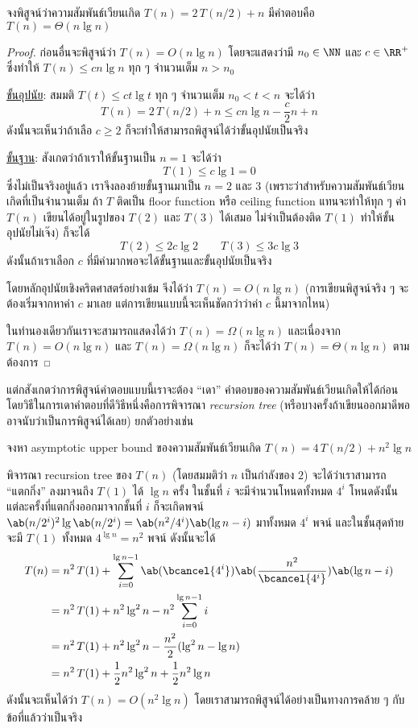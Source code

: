 \begin{exbox}
	จงพิสูจน์ว่าความสัมพันธ์เวียนเกิด $T(n) = 2\, T(n/2) + n$ มีคำตอบคือ $T(n) = \Theta(n\lg n)$
\end{exbox}
\begin{proof}
	ก่อนอื่นจะพิสูจน์ว่า $T(n) = O(n\lg n)$ โดยจะแสดงว่ามี $n_0 \in \NN$ และ $c \in \RR^+$ ซึ่งทำให้ $T(n) \leq cn\lg n$ ทุก ๆ จำนวนเต็ม $n > n_0$
	
	\underline{ขั้นอุปนัย}: สมมติ $T(t) \leq ct\lg t$ ทุก ๆ จำนวนเต็ม $n_0 < t < n$ จะได้ว่า
	\[
		T(n) = 2\,T(n/2) + n \leq cn\lg n - \frac{c}{2}n + n
	\]
	ดังนั้นจะเห็นว่าถ้าเลือ $c \geq 2$ ก็จะทำให้สามารถพิสูจน์ได้ว่าขั้นอุปนัยเป็นจริง
	
	\underline{ขั้นฐาน}: สังเกตว่าถ้าเราให้ขั้นฐานเป็น $n = 1$ จะได้ว่า
	\[
		T(1) \leq c\lg 1 = 0
	\]
	ซึ่งไม่เป็นจริงอยู่แล้ว เราจึงลองย้ายขั้นฐานมาเป็น $n = 2$ และ $3$ (เพราะว่าสำหรับความสัมพันธ์เวียนเกิดที่เป็นจำนวนเต็ม ถ้า $T$ ติดเป็น floor function หรือ ceiling function แทนจะทำให้ทุก ๆ ค่า $T(n)$ เขียนได้อยู่ในรูปของ $T(2)$ และ $T(3)$ ได้เสมอ ไม่จำเป็นต้องติด $T(1)$ ทำให้ขั้นอุปนัยไม่เจ๊ง) ก็จะได้
	\[
		T(2) \leq 2c\lg 2 \qquad T(3) \leq 3c\lg 3
	\]
	ดังนั้นถ้าเราเลือก $c$ ที่มีค่ามากพอจะได้ขั้นฐานและขั้นอุปนัยเป็นจริง
	
	โดยหลักอุปนัยเชิงคริตศาสตร์อย่างเข้ม จึงได้ว่า $T(n) = O(n\lg n)$ (การเขียนพิสูจน์จริง ๆ จะต้องเริ่มจากหาค่า $c$ มาเลย แต่การเขียนแบบนี้จะเห็นชัดกว่าว่าค่า $c$ นี้มาจากไหน)
	
	ในทำนองเดียวกันเราจะสามารถแสดงได้ว่า $T(n) = \Omega(n\lg n)$ และเนื่องจาก $T(n) = O(n\lg n)$ และ $T(n) = \Omega(n\lg n)$ ก็จะได้ว่า $T(n) = \Theta(n\lg n)$ ตามต้องการ
\end{proof}

แต่กสังเกตว่าการพิสูจน์คำตอบแบบนี้เราจะต้อง ``เดา'' คำตอบของความสัมพันธ์เวียนเกิดให้ได้ก่อน โดยวิธีในการเดาคำตอบที่ดีวิธีหนึ่งคือการพิจารณา \emph{recursion tree} (หรือบางครั้งถ้าเขียนออกมาดีพอ อาจนับว่าเป็นการพิสูจน์ได้เลย) ยกตัวอย่างเช่น

\begin{exbox}
	จงหา asymptotic upper bound ของความสัมพันธ์เวียนเกิด $T(n) = 4\,T(n/2) + n^2\lg n$
\end{exbox}
\begin{soln}
	พิจารณา recursion tree ของ $T(n)$ (โดยสมมติว่า $n$ เป็นกำลังของ $2$) จะได้ว่าเราสามารถ ``แตกกิ่ง'' ลงมาจนถึง $T(1)$ ได้ $\lg n$ ครั้ง ในชั้นที่ $i$ จะมีจำนวนโหนดทั้งหมด $4^i$ โหนดดังนั้นแต่ละครั้งที่แตกกิ่งออกมาจากชั้นที่ $i$ ก็จะเกิดพจน์ $\ab(n/2^i)^2\lg\ab(n/2^i) = \ab(n^2/4^i)\ab(\lg n - i)$ มาทั้งหมด $4^i$ พจน์ และในชั้นสุดท้ายจะมี $T(1)$ ทั้งหมด $4^{\lg n} = n^2$ พจน์ ดังนั้นจะได้
	\begin{align*}
		T(n) &= n^2\,T(1) + \sum_{i=0}^{\lg n-1}\ab(\bcancel{4^i})\ab(\frac{n^2}{\bcancel{4^i}})\ab(\lg n - i)\\
		&= n^2\,T(1) + n^2\lg^2 n - n^2\sum_{i=0}^{\lg n-1}i\\
		&= n^2\,T(1) + n^2\lg^2 n - \frac{n^2}{2}(\lg^2 n - \lg n)\\
		&= n^2\,T(1) + \frac{1}{2}n^2\lg^2 n + \frac{1}{2}n^2\lg n
	\end{align*}
	ดังนั้นจะเห็นได้ว่า $T(n) = O(n^2\lg n)$ โดยเราสามารถพิสูจน์ได้อย่างเป็นทางการคล้าย ๆ กับข้อที่แล้วว่าเป็นจริง
\end{soln}

